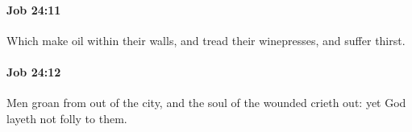 		\paragraph{Job 24:11} %
			\label{JOB-24-11}

			Which make oil within their walls, and tread their winepresses, and suffer thirst.


		\paragraph{Job 24:12} %
			\label{JOB-24-12}

			Men groan from out of the city, and the soul of the wounded crieth out: yet God layeth not folly to them.


